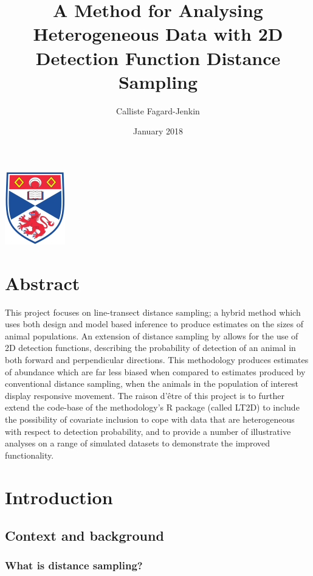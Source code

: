 \documentclass[11pt]{article}
\title{A Method for Analysing Heterogeneous Data with 2D Detection Function Distance Sampling}
\date{January 2018}
\author{Calliste Fagard-Jenkin}
\begin{document}
\maketitle
\begin{center}
\includegraphics[scale=1]{Logo}
\end{center}


\newpage

\begin{multicols}{2}
\newpage

\section{Abstract}
This project focuses on line-transect distance sampling; a hybrid method which uses both design and model based inference to produce estimates on the sizes of animal populations. An extension of distance sampling by \cite{Borchers} allows for the use of 2D detection functions, describing the probability of detection of an animal in both forward and perpendicular directions. This methodology produces estimates of abundance which are far less biased when compared to estimates produced by conventional distance sampling, when the animals in the population of interest display responsive movement. The raison d'être of this project is to further extend the code-base of the \cite{Borchers} methodology's R package (called LT2D) to include the possibility of covariate inclusion to cope with data that are heterogeneous with respect to detection probability, and to provide a number of illustrative analyses on a range of simulated datasets to demonstrate the improved functionality.

\section{Introduction}
\subsection{Context and background}


\subsubsection{What is distance sampling?}


\end{multicols}
\end{document}

